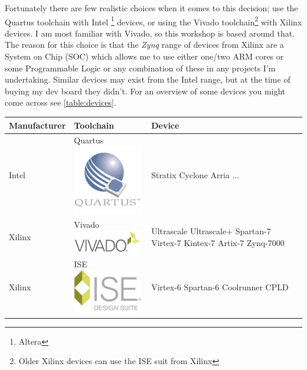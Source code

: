 \documentclass[11pt,a4paper]{article}
\begin{document}
Fortunately there are few realistic choices when it comes to this decision; use the Quartus toolchain with Intel \footnote{Altera} devices, or using the Vivado toolchain\footnote{Older Xilinx devices can use the ISE suit from Xilinx} with Xilinx devices. I am most familiar with Vivado, so this workshop is based around that. The reason for this choice is that the \emph{Zynq} range of devices from Xilinx are a System on Chip (SOC) which allows me to use either one/two ARM cores or some Programmable Logic or any combination of these in any projects I'm undertaking. Similar devices may exist from the Intel range, but at the time of buying my dev board they didn't. For an overview of some devices you might come across see \cref{table:devices}.

\begin{table}
    \begin{center}
        \begin{tabular}{| m{4cm} | m{4cm} | m{4cm} |}
            \hline
            Manufacturer & Toolchain & Device \\ \hline
            Intel & Quartus \newline \includegraphics[width=30mm]{./src/quartus_logo.png} & Stratix \newline Cyclone \newline Arria \newline ... \\ \hline
            Xilinx & Vivado \newline  \includegraphics[width=30mm]{./src/vivado_logo.jpg} & Ultrascale \newline Ultrascale+ \newline Spartan-7 \newline Virtex-7 \newline Kintex-7 \newline Artix-7 \newline Zynq-7000 \\ \hline
            Xilinx & ISE \newline \includegraphics[width=30mm]{./src/ise_logo.jpg} & Virtex-6 \newline Spartan-6 \newline Coolrunner CPLD \\ \hline

\end{tabular}
\end{center}
\end{table}
\end{document}
